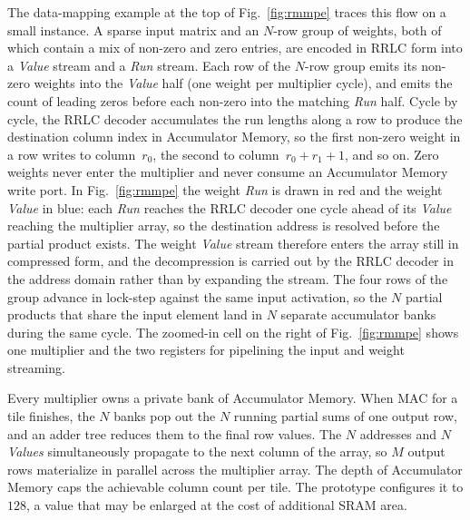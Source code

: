 \documentclass[lettersize,journal]{IEEEtran}
\begin{document}
The data-mapping example at the top of Fig.~\ref{fig:rmmpe} traces this flow on a small instance. A sparse input matrix and an $N$-row group of weights, both of which contain a mix of non-zero and zero entries, are encoded in RRLC form into a \textit{Value} stream and a \textit{Run} stream. Each row of the $N$-row group emits its non-zero weights into the \textit{Value} half (one weight per multiplier cycle), and emits the count of leading zeros before each non-zero into the matching \textit{Run} half. Cycle by cycle, the RRLC decoder accumulates the run lengths along a row to produce the destination column index in Accumulator Memory, so the first non-zero weight in a row writes to column~$r_{0}$, the second to column~$r_{0}{+}r_{1}{+}1$, and so on. Zero weights never enter the multiplier and never consume an Accumulator Memory write port. In Fig.~\ref{fig:rmmpe} the weight \textit{Run} is drawn in red and the weight \textit{Value} in blue: each \textit{Run} reaches the RRLC decoder one cycle ahead of its \textit{Value} reaching the multiplier array, so the destination address is resolved before the partial product exists. The weight \textit{Value} stream therefore enters the array still in compressed form, and the decompression is carried out by the RRLC decoder in the address domain rather than by expanding the stream. The four rows of the group advance in lock-step against the same input activation, so the $N$ partial products that share the input element land in $N$ separate accumulator banks during the same cycle. The zoomed-in cell on the right of Fig.~\ref{fig:rmmpe} shows one multiplier and the two registers for pipelining the input and weight streaming.

Every multiplier owns a private bank of Accumulator Memory. When MAC for a tile finishes, the $N$ banks pop out the $N$ running partial sums of one output row, and an adder tree reduces them to the final row values. The $N$ addresses and $N$ \textit{Values} simultaneously propagate to the next column of the array, so $M$ output rows materialize in parallel across the multiplier array. The depth of Accumulator Memory caps the achievable column count per tile. The prototype configures it to $128$, a value that may be enlarged at the cost of additional SRAM area. 
\end{document}
